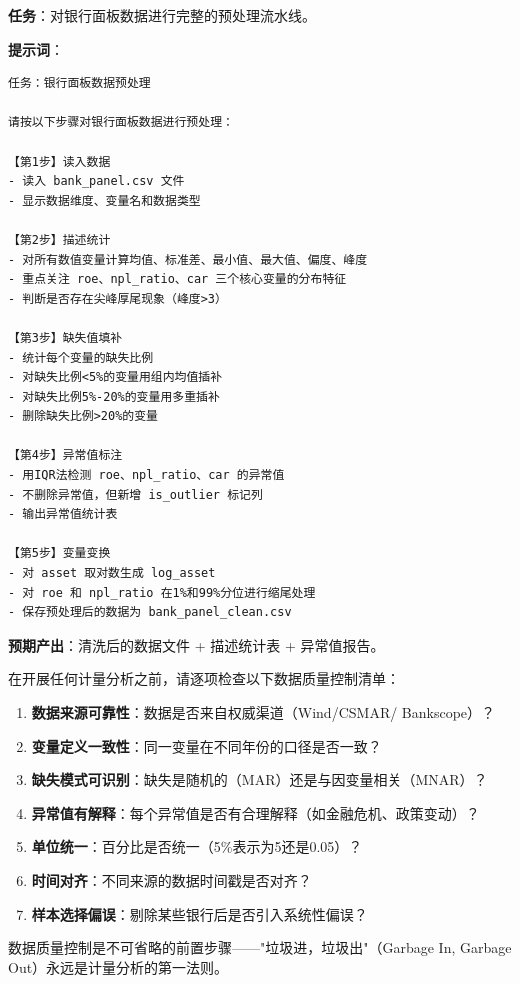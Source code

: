 \begin{practicebox}[实操：用AI完成银行面板数据预处理]
\textbf{任务}：对银行面板数据进行完整的预处理流水线。

\textbf{提示词}：

\begin{lstlisting}
任务：银行面板数据预处理

请按以下步骤对银行面板数据进行预处理：

【第1步】读入数据
- 读入 bank_panel.csv 文件
- 显示数据维度、变量名和数据类型

【第2步】描述统计
- 对所有数值变量计算均值、标准差、最小值、最大值、偏度、峰度
- 重点关注 roe、npl_ratio、car 三个核心变量的分布特征
- 判断是否存在尖峰厚尾现象（峰度>3）

【第3步】缺失值填补
- 统计每个变量的缺失比例
- 对缺失比例<5%的变量用组内均值插补
- 对缺失比例5%-20%的变量用多重插补
- 删除缺失比例>20%的变量

【第4步】异常值标注
- 用IQR法检测 roe、npl_ratio、car 的异常值
- 不删除异常值，但新增 is_outlier 标记列
- 输出异常值统计表

【第5步】变量变换
- 对 asset 取对数生成 log_asset
- 对 roe 和 npl_ratio 在1%和99%分位进行缩尾处理
- 保存预处理后的数据为 bank_panel_clean.csv
\end{lstlisting}

\textbf{预期产出}：清洗后的数据文件 + 描述统计表 + 异常值报告。
\end{practicebox}

\begin{theorybox}
在开展任何计量分析之前，请逐项检查以下数据质量控制清单：

\begin{enumerate}[leftmargin=2em]
  \item \textbf{数据来源可靠性}：数据是否来自权威渠道（Wind/CSMAR/ Bankscope）？
  \item \textbf{变量定义一致性}：同一变量在不同年份的口径是否一致？
  \item \textbf{缺失模式可识别}：缺失是随机的（MAR）还是与因变量相关（MNAR）？
  \item \textbf{异常值有解释}：每个异常值是否有合理解释（如金融危机、政策变动）？
  \item \textbf{单位统一}：百分比是否统一（5\%表示为5还是0.05）？
  \item \textbf{时间对齐}：不同来源的数据时间戳是否对齐？
  \item \textbf{样本选择偏误}：剔除某些银行后是否引入系统性偏误？
\end{enumerate}

数据质量控制是不可省略的前置步骤——"垃圾进，垃圾出"（Garbage In, Garbage Out）永远是计量分析的第一法则。
\end{theorybox}

